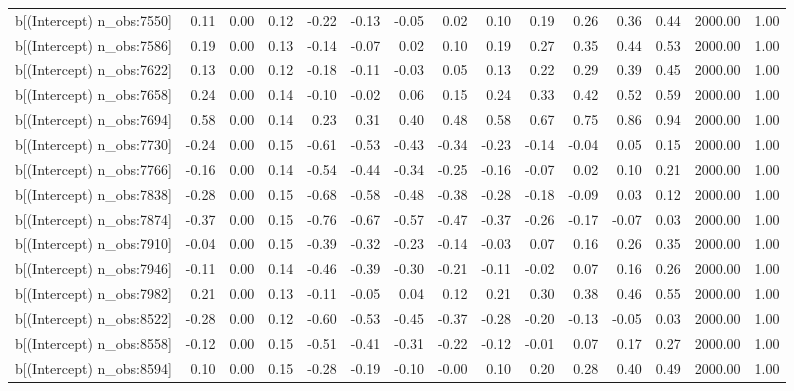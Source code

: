 \begin{table}[ht]
\begin{tabular}{rrrrrrrrrrrrrrr}
  b[(Intercept) n\_obs:7550] & 0.11 & 0.00 & 0.12 & -0.22 & -0.13 & -0.05 & 0.02 & 0.10 & 0.19 & 0.26 & 0.36 & 0.44 & 2000.00 & 1.00 \\ 
  b[(Intercept) n\_obs:7586] & 0.19 & 0.00 & 0.13 & -0.14 & -0.07 & 0.02 & 0.10 & 0.19 & 0.27 & 0.35 & 0.44 & 0.53 & 2000.00 & 1.00 \\ 
  b[(Intercept) n\_obs:7622] & 0.13 & 0.00 & 0.12 & -0.18 & -0.11 & -0.03 & 0.05 & 0.13 & 0.22 & 0.29 & 0.39 & 0.45 & 2000.00 & 1.00 \\ 
  b[(Intercept) n\_obs:7658] & 0.24 & 0.00 & 0.14 & -0.10 & -0.02 & 0.06 & 0.15 & 0.24 & 0.33 & 0.42 & 0.52 & 0.59 & 2000.00 & 1.00 \\ 
  b[(Intercept) n\_obs:7694] & 0.58 & 0.00 & 0.14 & 0.23 & 0.31 & 0.40 & 0.48 & 0.58 & 0.67 & 0.75 & 0.86 & 0.94 & 2000.00 & 1.00 \\ 
  b[(Intercept) n\_obs:7730] & -0.24 & 0.00 & 0.15 & -0.61 & -0.53 & -0.43 & -0.34 & -0.23 & -0.14 & -0.04 & 0.05 & 0.15 & 2000.00 & 1.00 \\ 
  b[(Intercept) n\_obs:7766] & -0.16 & 0.00 & 0.14 & -0.54 & -0.44 & -0.34 & -0.25 & -0.16 & -0.07 & 0.02 & 0.10 & 0.21 & 2000.00 & 1.00 \\ 
  b[(Intercept) n\_obs:7838] & -0.28 & 0.00 & 0.15 & -0.68 & -0.58 & -0.48 & -0.38 & -0.28 & -0.18 & -0.09 & 0.03 & 0.12 & 2000.00 & 1.00 \\ 
  b[(Intercept) n\_obs:7874] & -0.37 & 0.00 & 0.15 & -0.76 & -0.67 & -0.57 & -0.47 & -0.37 & -0.26 & -0.17 & -0.07 & 0.03 & 2000.00 & 1.00 \\ 
  b[(Intercept) n\_obs:7910] & -0.04 & 0.00 & 0.15 & -0.39 & -0.32 & -0.23 & -0.14 & -0.03 & 0.07 & 0.16 & 0.26 & 0.35 & 2000.00 & 1.00 \\ 
  b[(Intercept) n\_obs:7946] & -0.11 & 0.00 & 0.14 & -0.46 & -0.39 & -0.30 & -0.21 & -0.11 & -0.02 & 0.07 & 0.16 & 0.26 & 2000.00 & 1.00 \\ 
  b[(Intercept) n\_obs:7982] & 0.21 & 0.00 & 0.13 & -0.11 & -0.05 & 0.04 & 0.12 & 0.21 & 0.30 & 0.38 & 0.46 & 0.55 & 2000.00 & 1.00 \\ 
  b[(Intercept) n\_obs:8522] & -0.28 & 0.00 & 0.12 & -0.60 & -0.53 & -0.45 & -0.37 & -0.28 & -0.20 & -0.13 & -0.05 & 0.03 & 2000.00 & 1.00 \\ 
  b[(Intercept) n\_obs:8558] & -0.12 & 0.00 & 0.15 & -0.51 & -0.41 & -0.31 & -0.22 & -0.12 & -0.01 & 0.07 & 0.17 & 0.27 & 2000.00 & 1.00 \\ 
  b[(Intercept) n\_obs:8594] & 0.10 & 0.00 & 0.15 & -0.28 & -0.19 & -0.10 & -0.00 & 0.10 & 0.20 & 0.28 & 0.40 & 0.49 & 2000.00 & 1.00 \\ 

\end{tabular}
\end{table}
